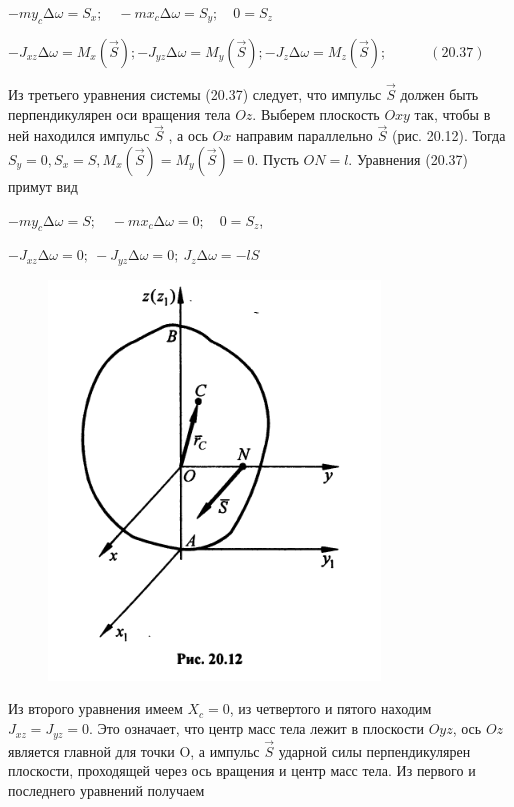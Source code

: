 {\begin{center}
\par $-my_c ∆ \omega = S_x; \quad -mx_c ∆ \omega = S_y; \quad 0 = S_z$

\par $-J_{xz} ∆ \omega = M_x (\vec{S}); -J_{yz} ∆ \omega = M_y (\vec{S}); -J_{z} ∆ \omega = M_z (\vec{S}); \quad\quad\quad (20.37)$

\par Из третьего  уравнения системы  (20.37) следует, что  импульс $\vec{S}$  должен быть  перпендикулярен  оси  вращения  тела  $Oz$.  Выберем  плоскость  $Oxy$  так, чтобы  в  ней  находился  импульс $\vec{S}$ ,  а  ось  $Ox$  направим  параллельно  $\vec{S}$  (рис. 20.12). Тогда $S_y = 0, S_x = S, M_x (\vec{S}) = M_y (\vec{S}) = 0$. Пусть $ON = l$. Уравнения (20.37) примут вид

\par $-my_c ∆ \omega = S; \quad -mx_c ∆ \omega = 0; \quad 0 = S_z$,

\par $-J_{xz} ∆ \omega = 0; \ -J_{yz} ∆ \omega = 0; \ J_{z} ∆ \omega = - l S$

\begin{figure}[H]
    \centering\includegraphics[scale=0.5]{img/20.12.jpeg} 
\end{figure}

\par Из второго уравнения имеем  $X_c = 0$, из четвертого  и  пятого  находим $J_{xz} = J_{yz} = 0$. Это означает, что центр масс тела лежит в плоскости $Oyz$, ось $Oz$ является главной для точки  O,  а  импульс $\vec{S}$ ударной  силы  перпендикулярен плоскости,  проходящей  через ось вращения и центр масс тела. Из первого и последнего уравнений получаем


\end{center}}
